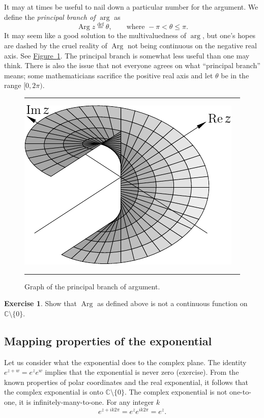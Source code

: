 \documentclass[12pt,openany]{book}
\newcommand{\Arg}{\operatorname{Arg}}
\newcommand{\C}{{\mathbb{C}}}
\newcommand{\myindex}[1]{#1\index{#1}}
\theoremstyle{plain}
\theoremstyle{remark}
\theoremstyle{definition}
\newenvironment{exbox}{%
    \def\FrameCommand{\vrule width 1pt \relax\hspace{10pt}}%
    \MakeFramed{\advance\hsize-\width\FrameRestore}%
}{%
    \endMakeFramed
}
\newenvironment{myfig}{%
\begin{figure}[h!t]
\noindent\rule{\textwidth}{0.4pt}\vspace{12pt}\par\centering}%
{\par\noindent\rule{\textwidth}{0.4pt}
\end{figure}}
\theoremstyle{exercise}
\newtheorem{exercise}{Exercise}[section]
\theoremstyle{example}
\newcommand{\figureref}[1]{\hyperref[#1]{Figure~\ref*{#1}}}
\begin{document}
It may at times be useful to nail down a particular number for the argument.
We define the \emph{\myindex{principal branch of $\arg$}} as
\begin{equation*}
\Arg z
\overset{\text{def}}{=}
\theta, \qquad \text{where } -\pi < \theta \leq \pi.
\end{equation*}
It may seem like a good solution to the multivaluedness of $\arg$, but
one's hopes are dashed by the cruel reality of $\Arg$ not being continuous
on the negative real axis.  See \figureref{fig:arggraph}.
The principal branch is somewhat less useful than one may think.
There is also the issue that not everyone agrees
on what ``principal branch'' means; some mathematicians sacrifice the
positive real axis and let $\theta$ be in the range $[0,2\pi)$.

\begin{myfig}
\includegraphics{figures/arggraph}
\caption{Graph of the principal branch of argument.\label{fig:arggraph}}
\end{myfig}

\begin{exbox}
\begin{exercise}
Show that $\Arg$ as defined above is not a continuous function on 
$\C \setminus \{ 0 \}$.
\end{exercise}
\end{exbox}

\subsection{Mapping properties of the exponential}

Let us consider what the exponential does to the complex plane.
The identity $e^{z+w} = e^z e^w$ implies that the exponential
is never zero (exercise).
From the known properties of polar coordinates
and the real exponential, it follows that the complex exponential is
onto $\C \setminus \{ 0 \}$.
The complex exponential is not one-to-one, it is 
infinitely-many-to-one.  For any integer $k$
\begin{equation*}
e^{z+ik2\pi} = 
e^{z} e^{ik2\pi} =
e^z .
\end{equation*}
\end{document}
